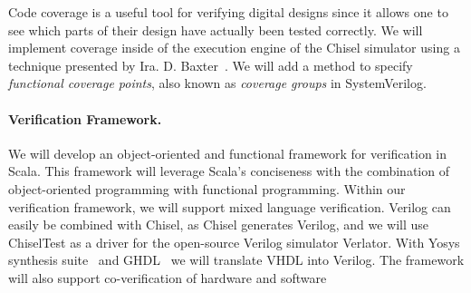 \documentclass[fleqn,12pt]{article}
\begin{document}
Code coverage is a useful tool for verifying digital designs
since it allows one to see which parts of their design have actually been tested correctly.
We will implement coverage inside of the execution engine of the Chisel simulator using a technique
presented by Ira. D. Baxter~\cite{branch-cov-made-easy:2002}.
We will add a method to specify \textit{functional coverage points}, also known as
\textit{coverage groups} in SystemVerilog.



%


\paragraph{Verification Framework.}

We will develop an object-oriented and functional framework for verification in Scala.
This framework will leverage Scala's conciseness with the
combination of object-oriented programming with functional programming.
Within our verification framework, we will support mixed language verification.
Verilog can easily be combined with Chisel, as Chisel generates Verilog, and
we will use ChiselTest as a driver for the open-source Verilog simulator Verlator.
With Yosys synthesis suite~\cite{Yosys} and GHDL~\cite{ghdl}
we will translate VHDL into Verilog.
The framework will also support co-verification of hardware and software
\end{document}
